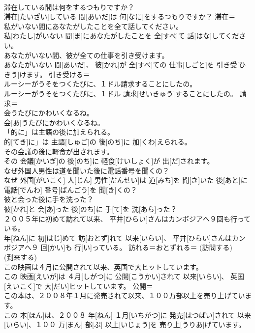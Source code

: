 \documentclass[8pt]{extreport}
\begin{document}
\begin{CJK}{UTF8}{min}
\\	滞在している間は何をするつもりですか？	
\\	滞在[たいざい]している 間[あいだ]は 何[なに]をするつもりですか？	滞在＝ 
\\	私がいない間にあなたがしたことを全て話してください。	
\\	私[わたし]がいない 間[ま]にあなたがしたことを 全[すべ]て 話[はな]してください。	
\\	あなたがいない間、彼が全ての仕事を引き受けます。	
\\	あなたがいない 間[あいだ]、 彼[かれ]が 全[すべ]ての 仕事[しごと]を 引き受[ひきう]けます。	引き受ける＝ 
\\	ルーシーがうそをつくたびに、１ドル請求することにしたの。	
\\	ルーシーがうそをつくたびに、１ドル 請求[せいきゅう]することにしたの。	請求＝ 
\\	会うたびにかわいくなるね。	
\\	会[あ]うたびにかわいくなるね。	
\\	「的に」は主語の後に加えられる。	
\\	的[てき]に」は 主語[しゅご]の 後[のち]に 加[くわ]えられる。	
\\	その会議の後に軽食が出されます。	
\\	その 会議[かいぎ]の 後[のち]に 軽食[けいしょく]が 出[だ]されます。	
\\	なぜ外国人男性は道を聞いた後に電話番号を聞くの？	
\\	なぜ 外国[がいこく] 人[じん] 男性[だんせい]は 道[みち]を 聞[き]いた 後[あと]に 電話[でんわ] 番号[ばんごう]を 聞[き]くの？	
\\	彼と会った後に手を洗った？	
\\	彼[かれ]と 会[あ]った 後[のち]に 手[て]を 洗[あら]った？	
\\	２００５年に初めて訪れて以来、 平井[ひらい]さんはカンボジアへ９回も行っている。	
\\	年[ねん]に 初[はじ]めて 訪[おとず]れて 以来[いらい]、 平井[ひらい]さんはカンボジアへ９ 回[かい]も 行[い]っている。	訪れる＝おとずれる＝ (訪問する) 
\\	(到来する) 
\\	この映画は４月に公開されて以来、英国で大ヒットしています。	
\\	この 映画[えいが]は ４月[しがつ]に 公開[こうかい]されて 以来[いらい]、 英国[えいこく]で 大[だい]ヒットしています。	公開＝ 
\\	この本は、２００８年１月に発売されて以来、１００万部以上を売り上げています。	
\\	この 本[ほん]は、２００８ 年[ねん] １月[いちがつ]に 発売[はつばい]されて 以来[いらい]、１００ 万[まん] 部[ぶ] 以上[いじょう]を 売り上[うりあ]げています。	

\end{CJK}
\end{document}
